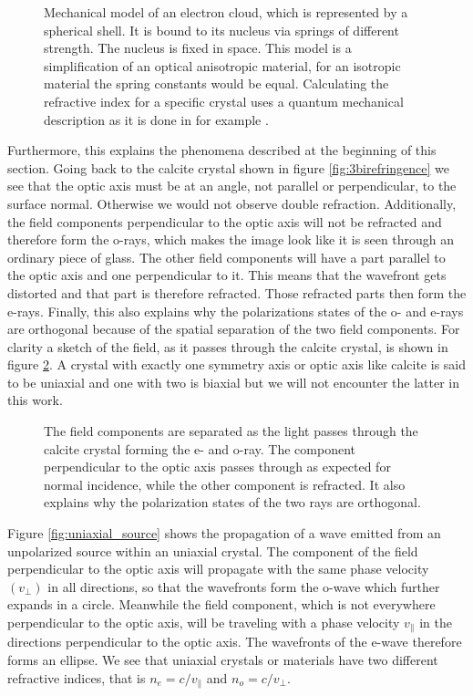 \begin{figure}[h]
    \centering
    
    \caption{Mechanical model of an electron cloud, which is represented by a spherical shell. It is bound to its nucleus via springs of different strength. The nucleus is fixed in space. This model is a simplification of an optical anisotropic material, for an isotropic material the spring constants would be equal. Calculating the refractive index for a specific crystal uses a quantum mechanical description as it is done in for example \cite{Rerat2020FromApproach}.}
    \label{fig:electron_shell}
\end{figure}

Furthermore, this explains the phenomena described at the beginning of this section. Going back to the calcite crystal shown in figure \ref{fig:3birefringence} we see that the optic axis must be at an angle, not parallel or perpendicular, to the surface normal. Otherwise we would not observe double refraction. Additionally, the field components perpendicular to the optic axis will not be refracted and therefore form the o-rays, which makes the image look like it is seen through an ordinary piece of glass. The other field components will have a part parallel to the optic axis and one perpendicular to it. This means that the wavefront gets distorted and that part is therefore refracted. Those refracted parts then form the e-rays. Finally, this also explains why the polarizations states of the o- and e-rays are orthogonal because of the spatial separation of the two field components. For clarity a sketch of the field, as it passes through the calcite crystal, is shown in figure \ref{fig:calcite_beams}. A crystal with exactly one symmetry axis or optic axis like calcite is said to be uniaxial and one with two is biaxial but we will not encounter the latter in this work. 

\begin{figure}[h]
    \centering
    
    \caption{The field components are separated as the light passes through the calcite crystal forming the e- and o-ray. The component perpendicular to the optic axis passes through as expected for normal incidence, while the other component is refracted. It also explains why the polarization states of the two rays are orthogonal.}
    \label{fig:calcite_beams}
\end{figure}

Figure \ref{fig:uniaxial_source} shows the propagation of a wave emitted from an unpolarized source within an uniaxial crystal. The component of the field perpendicular to the optic axis will propagate with the same phase velocity $(v_{\bot})$ in all directions, so that the wavefronts form the o-wave which further expands in a circle. Meanwhile the field component, which is not everywhere perpendicular to the optic axis, will be traveling with a phase velocity $v_{\parallel}$ in the directions perpendicular to the optic axis. The wavefronts of the e-wave therefore forms an ellipse. We see that uniaxial crystals or materials have two different refractive indices, that is $n_e = c/v_{\parallel}$ and $n_o = c/v_{\bot}$. 

